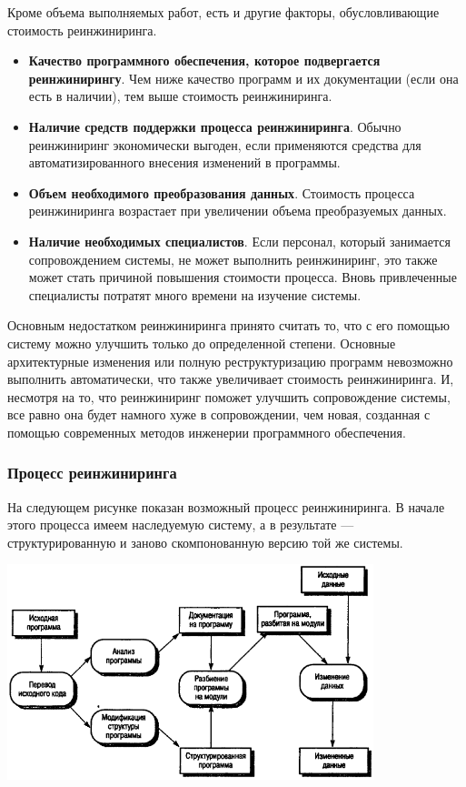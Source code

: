 \documentclass{../../text-style}
\begin{document}
Кроме объема выполняемых работ, есть и другие факторы, обусловливающие стоимость реинжиниринга.

\begin{itemize}
    \item \textbf{Качество программного обеспечения, которое подвергается реинжинирингу}. Чем ниже качество программ и их документации (если она есть в наличии), тем выше стоимость реинжиниринга.
    \item \textbf{Наличие средств поддержки процесса реинжиниринга}. Обычно реинжиниринг экономически выгоден, если применяются средства для автоматизированного внесения изменений в программы.
    \item \textbf{Объем необходимого преобразования данных}. Стоимость процесса реинжиниринга возрастает при увеличении объема преобразуемых данных.
    \item \textbf{Наличие необходимых специалистов}. Если персонал, который занимается сопровождением системы, не может выполнить реинжиниринг, это также может стать причиной повышения стоимости процесса. Вновь привлеченные специалисты потратят много времени на изучение системы.
\end{itemize}

Основным недостатком реинжиниринга принято считать то, что с его помощью систему можно улучшить только до определенной степени. Основные архитектурные изменения или полную реструктуризацию программ невозможно выполнить автоматически, что также увеличивает стоимость реинжиниринга. И, несмотря на то, что реинжиниринг поможет улучшить сопровождение системы, все равно она будет намного хуже в сопровождении, чем новая, созданная с помощью современных методов инженерии программного обеспечения.

\subsubsection{Процесс реинжиниринга}

На следующем рисунке показан возможный процесс реинжиниринга. В начале этого процесса имеем наследуемую систему, а в результате --- структурированную и заново скомпонованную версию той же системы. 

\begin{center}
    \includegraphics[width=0.8\textwidth]{reengineeringProcess.png}
\end{center}
\end{document}
